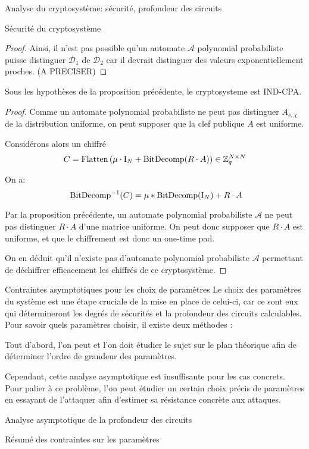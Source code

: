 \begin{section}{Analyse du cryptosystème: sécurité, profondeur des circuits}
\begin{subsection}{Sécurité du cryptosystème}
\begin{proof}
	Ainsi, il n'est pas possible qu'un automate $\mathcal{A}$
	polynomial probabiliste puisse distinguer 
	$\mathcal{D}_1$ de $\mathcal{D}_2$ car il devrait distinguer
	des valeurs exponentiellement proches. (A PRECISER)
	\end{proof}

	\begin{thm}
	Sous les hypothèses de la proposition précédente, le
	cryptosysteme est IND-CPA.
	\end{thm}
	\begin{proof}
	Comme un automate polynomial probabiliste ne peut pas distinguer
	$A_{s, \chi}$ de la distribution uniforme, on peut supposer que la
	clef publique $A$ est uniforme.

	Considérons alors un chiffré 
	\[C = \text{Flatten}\left(\mu \cdot \text{I}_N + \text{BitDecomp}(R\cdot A)\right) \in
	\mathbb{Z}_q^{N\times N}\]

	On a:
	\[ \bitdecomp^{-1}(C) = \mu * \bitdecomp(\id_N) + R\cdot A\]

	Par la proposition précédente, un automate polynomial probabiliste $\mathcal{A}$
	ne peut pas distinguer $R\cdot A$ d'une matrice uniforme. On peut donc
	supposer que $R\cdot A$ est uniforme, et que le chiffrement est donc
	un one-time pad.

	On en déduit qu'il n'existe pas d'automate polynomial probabiliste
	$\mathcal{A}$ permettant de déchiffrer efficacement les chiffrés de ce cryptosystème.
	\end{proof}
	
	\end{subsection}

	\begin{subsection}{Contraintes asymptotiques pour les choix de paramètres} 
		Le choix des paramètres du système est une étape cruciale de la mise en place de celui-ci,
	car ce sont eux qui détermineront les degrés de sécurités et la profondeur des circuits calculables.
	Pour savoir quels paramètres choisir, il existe deux méthodes :
	
	Tout d'abord, l'on peut et l'on doit étudier le sujet sur le plan théorique afin de déterminer
	l'ordre de grandeur des paramètres.
	
	Cependant, cette analyse asymptotique est insuffisante pour les cas concrets. Pour palier à ce
	problème, l'on peut étudier un certain choix précis de paramètres en essayant de l'attaquer afin
	d'estimer sa résistance concrète aux attaques.
	\begin{subsubsection}{Analyse asymptotique de la profondeur des circuits}
	\end{subsubsection}
	\begin{subsubsection}{Résumé des contraintes sur les paramètres}
	\end{subsubsection}
	\end{subsection} %


\end{section}

